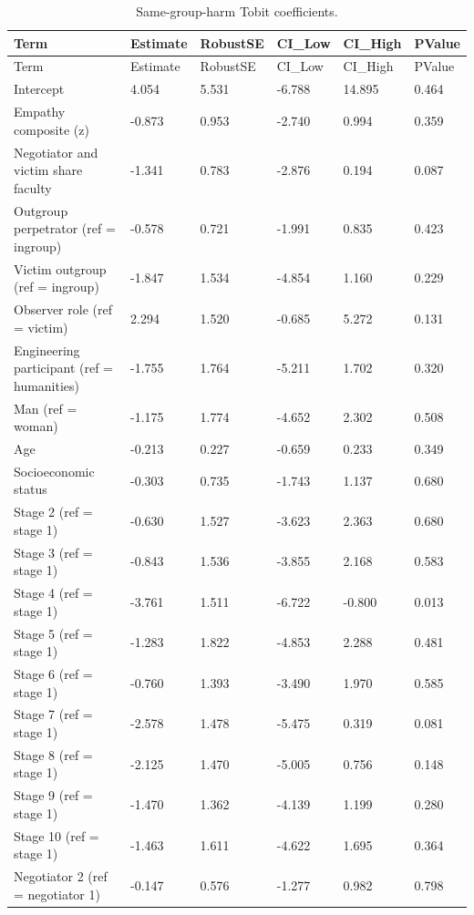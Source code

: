 \documentclass[11pt]{article}
\begin{document}
\begin{longtable}{llllll}
\caption{Same-group-harm Tobit coefficients.}\label{tab:betrayal_tobit}\\
\toprule
Term & Estimate & RobustSE & CI\_Low & CI\_High & PValue \\
\midrule
\endfirsthead
\toprule
Term & Estimate & RobustSE & CI\_Low & CI\_High & PValue \\
\midrule
\endhead
Intercept & 4.054 & 5.531 & -6.788 & 14.895 & 0.464 \\
Empathy composite (z) & -0.873 & 0.953 & -2.740 & 0.994 & 0.359 \\
Negotiator and victim share faculty & -1.341 & 0.783 & -2.876 & 0.194 & 0.087 \\
Outgroup perpetrator (ref = ingroup) & -0.578 & 0.721 & -1.991 & 0.835 & 0.423 \\
Victim outgroup (ref = ingroup) & -1.847 & 1.534 & -4.854 & 1.160 & 0.229 \\
Observer role (ref = victim) & 2.294 & 1.520 & -0.685 & 5.272 & 0.131 \\
Engineering participant (ref = humanities) & -1.755 & 1.764 & -5.211 & 1.702 & 0.320 \\
Man (ref = woman) & -1.175 & 1.774 & -4.652 & 2.302 & 0.508 \\
Age & -0.213 & 0.227 & -0.659 & 0.233 & 0.349 \\
Socioeconomic status & -0.303 & 0.735 & -1.743 & 1.137 & 0.680 \\
Stage 2 (ref = stage 1) & -0.630 & 1.527 & -3.623 & 2.363 & 0.680 \\
Stage 3 (ref = stage 1) & -0.843 & 1.536 & -3.855 & 2.168 & 0.583 \\
Stage 4 (ref = stage 1) & -3.761 & 1.511 & -6.722 & -0.800 & 0.013 \\
Stage 5 (ref = stage 1) & -1.283 & 1.822 & -4.853 & 2.288 & 0.481 \\
Stage 6 (ref = stage 1) & -0.760 & 1.393 & -3.490 & 1.970 & 0.585 \\
Stage 7 (ref = stage 1) & -2.578 & 1.478 & -5.475 & 0.319 & 0.081 \\
Stage 8 (ref = stage 1) & -2.125 & 1.470 & -5.005 & 0.756 & 0.148 \\
Stage 9 (ref = stage 1) & -1.470 & 1.362 & -4.139 & 1.199 & 0.280 \\
Stage 10 (ref = stage 1) & -1.463 & 1.611 & -4.622 & 1.695 & 0.364 \\
Negotiator 2 (ref = negotiator 1) & -0.147 & 0.576 & -1.277 & 0.982 & 0.798 \\
\bottomrule
\end{longtable}
\end{document}
